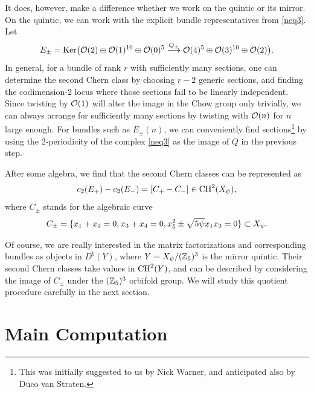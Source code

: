It does, however, make a difference whether we work on the quintic or its 
mirror. On the quintic, we can work with the explicit bundle representatives
from \eqref{neq3}. Let
\begin{equation}
E_\pm = {\rm Ker}\bigl({\cal O}(2)\oplus{\cal O}(1)^{10}\oplus{\cal O}(0)^5
\overset{Q_{\pm}}{\longrightarrow} {\cal O}(4)^5\oplus{\cal O}(3)^{10}\oplus{\cal O}(2)\bigr) .
\end{equation}
In general, for a bundle of rank $r$ with sufficiently many sections, one can 
determine the second Chern class by choosing $r-2$ generic sections, and finding
the codimension-2 locus where those sections fail to be linearly independent.
Since twisting by ${\cal O}(1)$ will alter the image in the Chow group only
trivially, we can always arrange for sufficiently many sections by twisting
with ${\cal O}(n)$ for $n$ large enough. For bundles such as $E_\pm(n)$, we can
conveniently find sections\footnote{This was initially suggested to us by Nick 
Warner, and anticipated also by Duco van Straten.} by using the 2-periodicity 
of the complex \eqref{neq3} as the image of $Q$ in the previous step.

After some algebra, we find that the second Chern classes can be represented
as
\begin{equation}
c_2(E_+) - c_2(E_-) = [C_+-C_-] \in {\rm CH}^2(X_\psi) ,
\end{equation}
where $C_\pm$ stands for the algebraic curve
\begin{equation}
\eqlabel{cplusminus}
C_\pm = \{ x_1+x_2=0,x_3+x_4=0,x_5^2\pm\sqrt{5\psi} x_1x_3=0\}\subset X_\psi .
\end{equation}

Of course, we are really interested in the matrix factorizations and
corresponding bundles as objects in $D^b(Y)$, where $Y=X_\psi/({\mathbb Z}_5)^3$ 
is the mirror quintic. Their second Chern classes take values in 
${\rm CH}^2(Y)$, and can be described by considering the image of $C_\pm$ 
under the $({\mathbb Z}_5)^3$ orbifold group. We will study this quotient procedure 
carefully in the next section.




\section{Main Computation}
\label{main}


